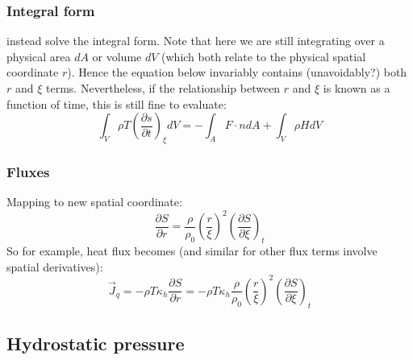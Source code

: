 \subsubsection{Integral form}
\cite{BSW18} instead solve the integral form.  Note that here we are still integrating over a physical area $dA$ or volume $dV$ (which both relate to the physical spatial coordinate $r$).  Hence the equation below invariably contains (unavoidably?) both $r$ and $\xi$ terms.  Nevertheless, if the relationship between $r$ and $\xi$ is known as a function of time, this is still fine to evaluate:
\begin{equation}
\int_V \rho T \left( \frac{\partial s}{\partial t} \right)_\xi dV = - \int_A F \cdot n dA + \int_V \rho H dV
\end{equation}
\subsubsection{Fluxes}
Mapping to new spatial coordinate:
\begin{equation}
\frac{\partial S}{\partial r}=\frac{\rho}{\rho_0} \left( \frac{r}{\xi} \right)^2 \left(\frac{\partial S}{\partial \xi} \right)_t
\end{equation}
So for example, heat flux becomes (and similar for other flux terms involve spatial derivatives):
\begin{equation}
\vec{J}_q=-\rho T \kappa_h \frac{\partial S}{\partial r} = -\rho T \kappa_h \frac{\rho}{\rho_0} \left( \frac{r}{\xi} \right)^2 \left(\frac{\partial S}{\partial \xi} \right)_t
\end{equation}
\subsection{Hydrostatic pressure}
\label{sect:hydrostatic}
\\
